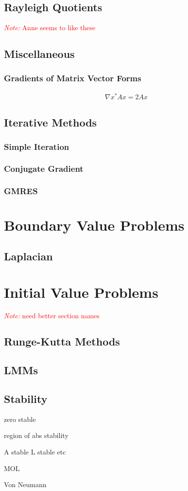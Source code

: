 \documentclass[12pt]{article}
\newcommand{\note}[1]{\textcolor{red}{\textit{Note:} #1}}
\begin{document}
\subsection{Rayleigh Quotients}
\note{Anne seems to like these}


\subsection{Miscellaneous}

\subsubsection{Gradients of Matrix Vector Forms}
\begin{align*}
\nabla x^*Ax = 2Ax
\end{align*}


\subsection{Iterative Methods}

\subsubsection{Simple Iteration}

\subsubsection{Conjugate Gradient}

\subsubsection{GMRES}



\section{Boundary Value Problems}

\subsection{Laplacian}



\section{Initial Value Problems}
\note{need better section names}

\subsection{Runge-Kutta Methods}


\subsection{LMMs}


\subsection{Stability}


zero stable

region of abs stability

A stable L stable etc

MOL

Von Neumann
\end{document}
